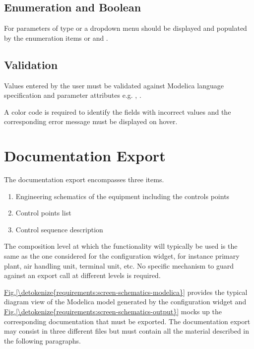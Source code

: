\documentclass[letterpaper,10pt, openany,english]{sphinxmanual}
\begin{document}
\subsection{Enumeration and Boolean}
\label{\detokenize{requirements:enumeration-and-boolean}}
For parameters of type  or  a dropdown menu should be displayed and populated by the enumeration items or  and .


\subsection{Validation}
\label{\detokenize{requirements:validation}}
Values entered by the user must be validated  against Modelica language specification  and parameter attributes e.g. , .

A color code is required to identify the fields with incorrect values and the corresponding error message must be displayed on hover.


\section{Documentation Export}
\label{\detokenize{requirements:documentation-export}}\label{\detokenize{requirements:sec-documentation-export}}
The documentation export encompasses three items.
\begin{enumerate}
%
\item {} 
Engineering schematics of the equipment including the controls points

\item {} 
Control points list

\item {} 
Control sequence description

\end{enumerate}

The composition level at which the functionality will typically be used is the same as the one considered for the configuration widget, for instance primary plant, air handling unit, terminal unit, etc. No specific mechanism to guard against an export call at different levels is required.

\hyperref[\detokenize{requirements:screen-schematics-modelica}]{Fig.\@ \ref{\detokenize{requirements:screen-schematics-modelica}}} provides the typical diagram view of the Modelica model generated by the configuration widget and \hyperref[\detokenize{requirements:screen-schematics-output}]{Fig.\@ \ref{\detokenize{requirements:screen-schematics-output}}} mocks up the corresponding documentation that must be exported. The documentation export may consist in three different files but must contain all the material described in the following paragraphs.
\end{document}
